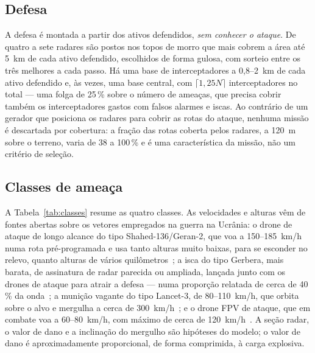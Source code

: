 \subsection{Defesa}
A defesa é montada a partir dos ativos defendidos, \emph{sem conhecer o ataque}. De quatro a sete radares são postos nos
topos de morro que mais cobrem a área até 5~km de cada ativo defendido, escolhidos de forma gulosa, com sorteio entre os
três melhores a cada passo. Há uma base de interceptadores a 0,8--2~km de cada ativo defendido e, às vezes, uma base
central, com $\lceil 1{,}25N\rceil$ interceptadores no total --- uma folga de 25\,\% sobre o número de ameaças, que precisa
cobrir também os interceptadores gastos com falsos alarmes e iscas. Ao contrário de um gerador que posiciona os radares
para cobrir as rotas do ataque, nenhuma missão é descartada por cobertura: a fração das rotas coberta pelos radares, a
120~m sobre o terreno, varia de 38 a 100\,\% e é uma característica da missão, não um critério de seleção.

\subsection{Classes de ameaça}
A Tabela~\ref{tab:classes} resume as quatro classes. As velocidades e alturas vêm de fontes abertas sobre os vetores
empregados na guerra na Ucrânia: o drone de ataque de longo alcance do tipo Shahed-136/Geran-2, que voa a 150--185~km/h
numa rota pré-programada e usa tanto alturas muito baixas, para se esconder no relevo, quanto alturas de vários
quilômetros~\cite{gurShahed,gsGeran2,dwShahed}; a isca do tipo Gerbera, mais barata, de assinatura de radar parecida ou
ampliada, lançada junto com os drones de ataque para atrair a defesa --- numa proporção relatada de cerca de 40\,\% da
onda~\cite{isisGerbera,capssGerbera,dnGerbera}; a munição vagante do tipo Lancet-3, de 80--110~km/h, que orbita sobre o
alvo e mergulha a cerca de 300~km/h~\cite{gdLancet,gsLancet}; e o drone FPV de ataque, que em combate voa a 60--80~km/h,
com máximo de cerca de 120~km/h~\cite{kyivpostFPV}. A seção radar, o valor de dano e a inclinação do mergulho são
hipóteses do modelo; o valor de dano é aproximadamente proporcional, de forma comprimida, à carga explosiva.

